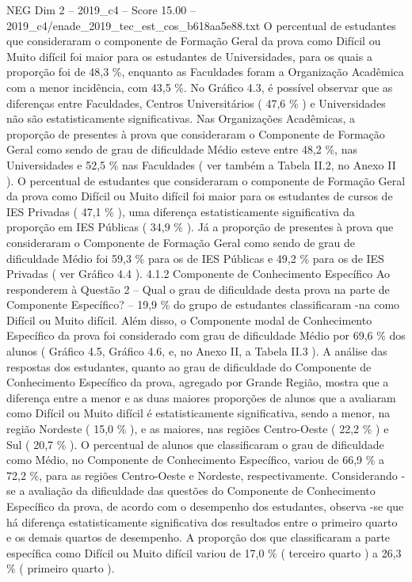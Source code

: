 \begin{textsample}{NEG Dim 2 – 2019\_c4 – Score 15.00 – 2019\_c4/enade\_2019\_tec\_est\_cos\_b618aa5e88.txt}
O percentual de estudantes que consideraram o componente de Formação Geral da prova como Difícil ou Muito difícil foi maior para os estudantes de Universidades, para os quais a proporção foi de 48,3 \%, enquanto as Faculdades foram a Organização Acadêmica com a menor incidência, com 43,5 \%.
No Gráfico 4.3, é possível observar que as diferenças entre Faculdades, Centros Universitários ( 47,6 \% ) e Universidades não são estatisticamente significativas.
Nas Organizações Acadêmicas, a proporção de presentes à prova que consideraram o Componente de Formação Geral como sendo de grau de dificuldade Médio esteve entre 48,2 \%, nas Universidades e 52,5 \% nas Faculdades ( ver também a Tabela II.2, no Anexo II ).
O percentual de estudantes que consideraram o componente de Formação Geral da prova como Difícil ou Muito difícil foi maior para os estudantes de cursos de IES Privadas ( 47,1 \% ), uma diferença estatisticamente significativa da proporção em IES Públicas ( 34,9 \% ).
Já a proporção de presentes à prova que consideraram o Componente de Formação Geral como sendo de grau de dificuldade Médio foi 59,3 \% para os de IES Públicas e 49,2 \% para os de IES Privadas ( ver Gráfico 4.4 ). 4.1.2 Componente de Conhecimento Específico Ao responderem à Questão 2 – Qual o grau de dificuldade desta prova na parte de Componente Específico? – 19,9 \% do grupo de estudantes classificaram -na como Difícil ou Muito difícil.
Além disso, o Componente modal de Conhecimento Específico da prova foi considerado com grau de dificuldade Médio por 69,6 \% dos alunos ( Gráfico 4.5, Gráfico 4.6, e, no Anexo II, a Tabela II.3 ).
A análise das respostas dos estudantes, quanto ao grau de dificuldade do Componente de Conhecimento Específico da prova, agregado por Grande Região, mostra que a diferença entre a menor e as duas maiores proporções de alunos que a avaliaram como Difícil ou Muito difícil é estatisticamente significativa, sendo a menor, na região Nordeste ( 15,0 \% ), e as maiores, nas regiões Centro-Oeste ( 22,2 \% ) e Sul ( 20,7 \% ).
O percentual de alunos que classificaram o grau de dificuldade como Médio, no Componente de Conhecimento Específico, variou de 66,9 \% a 72,2 \%, para as regiões Centro-Oeste e Nordeste, respectivamente.
Considerando -se a avaliação da dificuldade das questões do Componente de Conhecimento Específico da prova, de acordo com o desempenho dos estudantes, observa -se que há diferença estatisticamente significativa dos resultados entre o primeiro quarto e os demais quartos de desempenho.
A proporção dos que classificaram a parte específica como Difícil ou Muito difícil variou de 17,0 \% ( terceiro quarto ) a 26,3 \% ( primeiro quarto ).

\end{textsample}
